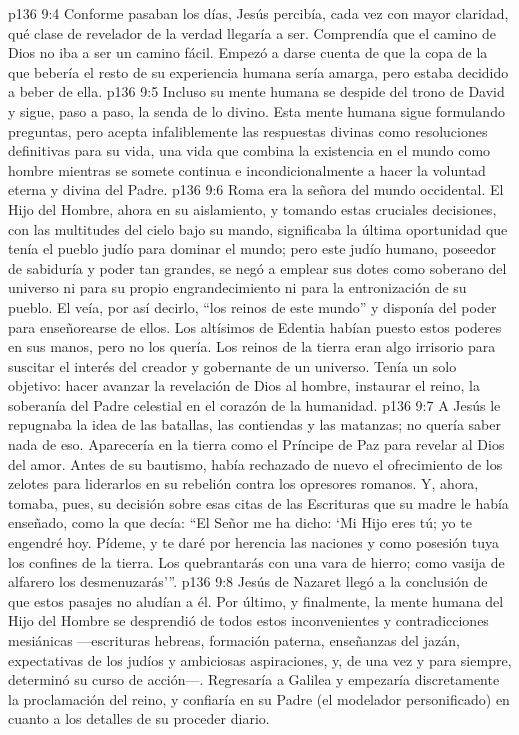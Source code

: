 \vs p136 9:4 Conforme pasaban los días, Jesús percibía, cada vez con mayor claridad, qué clase de revelador de la verdad llegaría a ser. Comprendía que el camino de Dios no iba a ser un camino fácil. Empezó a darse cuenta de que la copa de la que bebería el resto de su experiencia humana sería amarga, pero estaba decidido a beber de ella.
\vs p136 9:5 Incluso su mente humana se despide del trono de David y sigue, paso a paso, la senda de lo divino. Esta mente humana sigue formulando preguntas, pero acepta infaliblemente las respuestas divinas como resoluciones definitivas para su vida, una vida que combina la existencia en el mundo como hombre mientras se somete continua e incondicionalmente a hacer la voluntad eterna y divina del Padre.
\vs p136 9:6 Roma era la señora del mundo occidental. El Hijo del Hombre, ahora en su aislamiento, y tomando estas cruciales decisiones, con las multitudes del cielo bajo su mando, significaba la última oportunidad que tenía el pueblo judío para dominar el mundo; pero este judío humano, poseedor de sabiduría y poder tan grandes, se negó a emplear sus dotes como soberano del universo ni para su propio engrandecimiento ni para la entronización de su pueblo. El veía, por así decirlo, “los reinos de este mundo” y disponía del poder para enseñorearse de ellos. Los altísimos de Edentia habían puesto estos poderes en sus manos, pero no los quería. Los reinos de la tierra eran algo irrisorio para suscitar el interés del creador y gobernante de un universo. Tenía un solo objetivo: hacer avanzar la revelación de Dios al hombre, instaurar el reino, la soberanía del Padre celestial en el corazón de la humanidad.
\vs p136 9:7 A Jesús le repugnaba la idea de las batallas, las contiendas y las matanzas; no quería saber nada de eso. Aparecería en la tierra como el Príncipe de Paz para revelar al Dios del amor. Antes de su bautismo, había rechazado de nuevo el ofrecimiento de los zelotes para liderarlos en su rebelión contra los opresores romanos. Y, ahora, tomaba, pues, su decisión sobre esas citas de las Escrituras que su madre le había enseñado, como la que decía: “El Señor me ha dicho: ‘Mi Hijo eres tú; yo te engendré hoy. Pídeme, y te daré por herencia las naciones y como posesión tuya los confines de la tierra. Los quebrantarás con una vara de hierro; como vasija de alfarero los desmenuzarás’”.
\vs p136 9:8 Jesús de Nazaret llegó a la conclusión de que estos pasajes no aludían a él. Por último, y finalmente, la mente humana del Hijo del Hombre se desprendió de todos estos inconvenientes y contradicciones mesiánicas ---escrituras hebreas, formación paterna, enseñanzas del jazán, expectativas de los judíos y ambiciosas aspiraciones, y, de una vez y para siempre, determinó su curso de acción---. Regresaría a Galilea y empezaría discretamente la proclamación del reino, y confiaría en su Padre (el modelador personificado) en cuanto a los detalles de su proceder diario.
